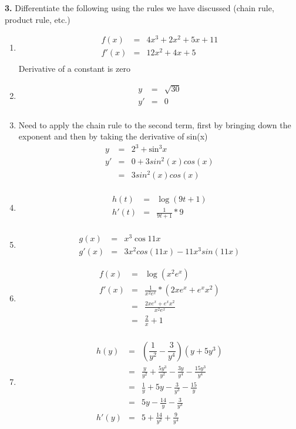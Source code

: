 \documentclass[12pt]{article}
\begin{document}
\bigskip 

\noindent \textbf{3.} Differentiate the following using the rules we have discussed (chain rule, product rule, etc.)
\begin{enumerate}
\item \begin{eqnarray*}
f(x) &=& 4x^3 + 2x^2 + 5x + 11\\
f'(x) &=& 12x^2 + 4x + 5\\
\end{eqnarray*}
Derivative of a constant is zero\\
\item \begin{eqnarray*}
 y &=& \sqrt{30}\\
 y' &=& 0\\
\end{eqnarray*}
\item
Need to apply the chain rule to the second term, first by bringing down the exponent and then by taking the derivative of sin(x)\\
\begin{eqnarray*}
y &=& 2^3 + \mbox{sin}^3x \\
y' &=& 0 + 3 sin^2(x)cos(x) \\
&=& 3 sin^2(x)cos(x) \\
\end{eqnarray*}
\item \begin{eqnarray*}
h(t) &=& \log(9t+1)\\
h'(t)&=& \frac{1}{9t+1}*9 \\
\end{eqnarray*}
\item \begin{eqnarray*}
g(x) &=& x^3  \cos 11x \\
g'(x) &=& 3x^2 cos(11x) - 11x^3 sin(11x)
\end{eqnarray*}
\item \begin{eqnarray*}
f(x) &=& \log(x^2e^x)\\
f'(x) &=& \frac{1}{x^2 e^x} * (2x e^x + e^x x^2)\\
&=& \frac{2x e^x + e^x x^2}{x^2 e^x}\\
&=& \frac{2}{x} + 1 \\
\end{eqnarray*}
\item 
\begin{eqnarray*}
h(y) &=&  ( \dfrac{1}{y^2} - \dfrac{3}{y^4})(y+5y^3)\\
 &=& \frac{y}{y^2} + \frac{5y^3}{y^2} - \frac{3y}{y^4} - \frac{15y^3}{y^4}\\
&=& \frac{1}{y} + 5y - \frac{3}{y^3} - \frac{15}{y}\\
&=& 5y - \frac{14}{y} - \frac{3}{y^3}\\
h'(y) &=& 5 + \frac{14}{y^2} + \frac{9}{y^4}
\end{eqnarray*}


\end{enumerate}
\end{document}
